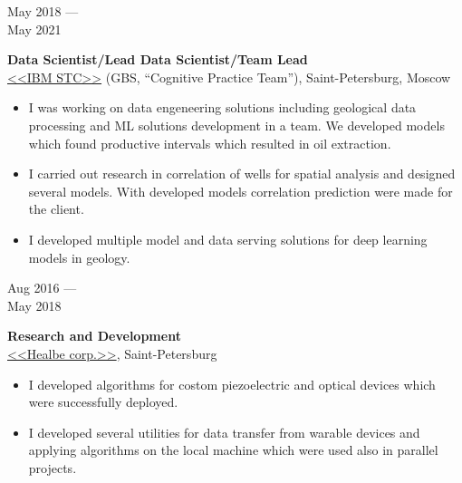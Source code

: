 \documentclass[10pt,a4paper]{article}
\newcommand{\lmpratio}{0.15}
\newcommand{\rmpratio}{0.74}
\newcommand{\vSpace}{0.5cm}
\newcommand{\horizontalSpace}{0.05\textwidth}
\newcommand{\sectionMain}[1]{\textbf{#1}}
\begin{document}
	\begin{minipage}[t]{\lmpratio\textwidth}
		May 2018 --- \\May 2021
	\end{minipage}
	\hspace{\horizontalSpace}
	\begin{minipage}[t]{\rmpratio\textwidth}
		\sectionMain{Data Scientist/Lead Data Scientist/Team Lead}\\
		\href{https://www.ibm.com/ru/rstl/index-en.html}{<<IBM STC>>} (GBS, ``Cognitive Practice Team''), Saint-Petersburg, Moscow\\[0.5cm]		
		
  
		\begin{itemize}
                \item 
I was working on data engeneering solutions including geological data processing and ML solutions development in a team.
We developed models which found productive intervals which resulted in oil extraction.
                \item 
I carried out research in correlation of wells for spatial analysis and designed several models.
With developed models correlation prediction were made for the client.
                \item
I developed multiple model and data serving solutions for deep learning models in geology.
                

            \end{itemize}
		
	\end{minipage}	
	\vspace{\vSpace}
	
	\begin{minipage}[t]{\lmpratio\textwidth}
		Aug 2016 --- \\May 2018
	\end{minipage}
	\hspace{\horizontalSpace}
	\begin{minipage}[t]{\rmpratio\textwidth}
		\sectionMain{Research and Development}\\
		\href{https://healbe.com/}{<<Healbe corp.>>}, Saint-Petersburg\\[0.5cm]		
		\begin{itemize}
                \item 
I developed algorithms for costom piezoelectric and optical devices which were successfully deployed.
                \item 
I developed several utilities for data transfer from warable devices and applying algorithms on the local machine which were used also in parallel projects.
            \end{itemize}
		 
		
	\end{minipage}	
	\vspace{\vSpace}
	
\end{document}
